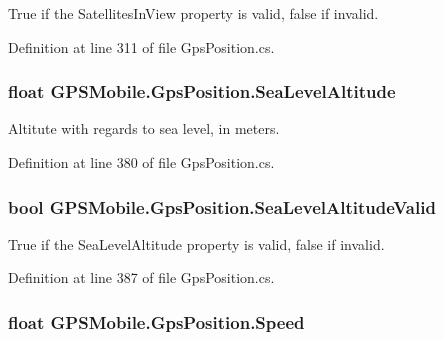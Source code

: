 True if the SatellitesInView property is valid, false if invalid. 

Definition at line 311 of file GpsPosition.cs.\hypertarget{class_g_p_s_mobile_1_1_gps_position_a132616cda8bc6677dc7cdc22bf4a0c79}{
\subsubsection[{SeaLevelAltitude}]{\setlength{\rightskip}{0pt plus 5cm}float GPSMobile.GpsPosition.SeaLevelAltitude}}
\label{class_g_p_s_mobile_1_1_gps_position_a132616cda8bc6677dc7cdc22bf4a0c79}


Altitute with regards to sea level, in meters. 

Definition at line 380 of file GpsPosition.cs.\hypertarget{class_g_p_s_mobile_1_1_gps_position_aae4f11b97d318dd8d6a67dba91eabb5e}{
\subsubsection[{SeaLevelAltitudeValid}]{\setlength{\rightskip}{0pt plus 5cm}bool GPSMobile.GpsPosition.SeaLevelAltitudeValid}}
\label{class_g_p_s_mobile_1_1_gps_position_aae4f11b97d318dd8d6a67dba91eabb5e}


True if the SeaLevelAltitude property is valid, false if invalid. 

Definition at line 387 of file GpsPosition.cs.\hypertarget{class_g_p_s_mobile_1_1_gps_position_aa6394677dc38656297fc26de38da88ee}{
\subsubsection[{Speed}]{\setlength{\rightskip}{0pt plus 5cm}float GPSMobile.GpsPosition.Speed}}
\label{class_g_p_s_mobile_1_1_gps_position_aa6394677dc38656297fc26de38da88ee}


